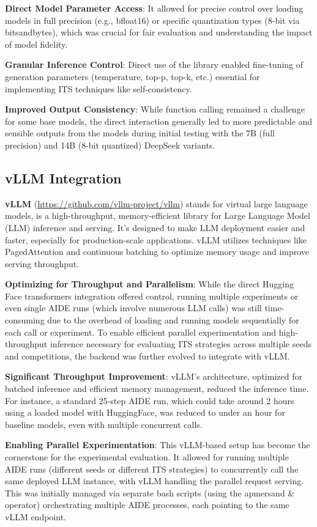 \textbf{Direct Model Parameter Access}: It allowed for precise control over loading models in full precision (e.g., bfloat16) or specific quantization types (8-bit via bitsandbytes), which was crucial for fair evaluation and understanding the impact of model fidelity.

\textbf{Granular Inference Control}: Direct use of the library enabled fine-tuning of generation parameters (temperature, top-p, top-k, etc.) essential for implementing ITS techniques like self-consistency.

\textbf{Improved Output Consistency}: While function calling remained a challenge for some base models, the direct interaction generally led to more predictable and sensible outputs from the models during initial testing with the 7B (full precision) and 14B (8-bit quantized) DeepSeek variants.

\subsection{vLLM Integration}

\textbf{vLLM} (\url{https://github.com/vllm-project/vllm}) stands for virtual large language models, is a high-throughput, memory-efficient library for Large Language Model (LLM) inference and serving. It's designed to make LLM deployment easier and faster, especially for production-scale applications. vLLM utilizes techniques like PagedAttention and continuous batching to optimize memory usage and improve serving throughput.

\textbf{Optimizing for Throughput and Parallelism}:
While the direct Hugging Face transformers integration offered control, running multiple experiments or even single AIDE runs (which involve numerous LLM calls) was still time-consuming due to the overhead of loading and running models sequentially for each call or experiment. To enable efficient parallel experimentation and high-throughput inference necessary for evaluating ITS strategies across multiple seeds and competitions, the backend was further evolved to integrate with vLLM.


\textbf{Significant Throughput Improvement}: vLLM's architecture, optimized for batched inference and efficient memory management, reduced the inference time. For instance, a standard 25-step AIDE run, which could take around 2 hours using a loaded model with HuggingFace, was reduced to under an hour for baseline models, even with multiple concurrent calls.

\textbf{Enabling Parallel Experimentation}: This vLLM-based setup has become the cornerstone for the experimental evaluation. It allowed for running multiple AIDE runs (different seeds or different ITS strategies) to concurrently call the same deployed LLM instance, with vLLM handling the parallel request serving. This was initially managed via separate bash scripts (using the apmersand \& operator) orchestrating multiple AIDE processes, each pointing to the same vLLM endpoint.

